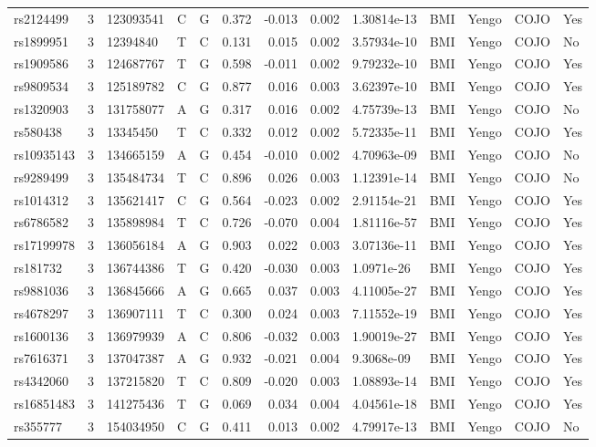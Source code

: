 \documentclass[11pt,twoside]{bristolthesis}
\begin{document}
\begin{longtable}[t]{lrlllrrrlllll}
rs2124499 & 3 & 123093541 & C & G & 0.372 & -0.013 & 0.002 & 1.30814e-13 & BMI & Yengo & COJO & Yes\\
\addlinespace
rs1899951 & 3 & 12394840 & T & C & 0.131 & 0.015 & 0.002 & 3.57934e-10 & BMI & Yengo & COJO & No\\
rs1909586 & 3 & 124687767 & T & G & 0.598 & -0.011 & 0.002 & 9.79232e-10 & BMI & Yengo & COJO & Yes\\
rs9809534 & 3 & 125189782 & C & G & 0.877 & 0.016 & 0.003 & 3.62397e-10 & BMI & Yengo & COJO & Yes\\
rs1320903 & 3 & 131758077 & A & G & 0.317 & 0.016 & 0.002 & 4.75739e-13 & BMI & Yengo & COJO & No\\
rs580438 & 3 & 13345450 & T & C & 0.332 & 0.012 & 0.002 & 5.72335e-11 & BMI & Yengo & COJO & Yes\\
\addlinespace
rs10935143 & 3 & 134665159 & A & G & 0.454 & -0.010 & 0.002 & 4.70963e-09 & BMI & Yengo & COJO & No\\
rs9289499 & 3 & 135484734 & T & C & 0.896 & 0.026 & 0.003 & 1.12391e-14 & BMI & Yengo & COJO & No\\
rs1014312 & 3 & 135621417 & C & G & 0.564 & -0.023 & 0.002 & 2.91154e-21 & BMI & Yengo & COJO & Yes\\
rs6786582 & 3 & 135898984 & T & C & 0.726 & -0.070 & 0.004 & 1.81116e-57 & BMI & Yengo & COJO & Yes\\
rs17199978 & 3 & 136056184 & A & G & 0.903 & 0.022 & 0.003 & 3.07136e-11 & BMI & Yengo & COJO & Yes\\
\addlinespace
rs181732 & 3 & 136744386 & T & G & 0.420 & -0.030 & 0.003 & 1.0971e-26 & BMI & Yengo & COJO & Yes\\
rs9881036 & 3 & 136845666 & A & G & 0.665 & 0.037 & 0.003 & 4.11005e-27 & BMI & Yengo & COJO & Yes\\
rs4678297 & 3 & 136907111 & T & C & 0.300 & 0.024 & 0.003 & 7.11552e-19 & BMI & Yengo & COJO & Yes\\
rs1600136 & 3 & 136979939 & A & C & 0.806 & -0.032 & 0.003 & 1.90019e-27 & BMI & Yengo & COJO & Yes\\
rs7616371 & 3 & 137047387 & A & G & 0.932 & -0.021 & 0.004 & 9.3068e-09 & BMI & Yengo & COJO & Yes\\
\addlinespace
rs4342060 & 3 & 137215820 & T & C & 0.809 & -0.020 & 0.003 & 1.08893e-14 & BMI & Yengo & COJO & Yes\\
rs16851483 & 3 & 141275436 & T & G & 0.069 & 0.034 & 0.004 & 4.04561e-18 & BMI & Yengo & COJO & Yes\\
rs355777 & 3 & 154034950 & C & G & 0.411 & 0.013 & 0.002 & 4.79917e-13 & BMI & Yengo & COJO & No\\

\end{longtable}
\end{document}
